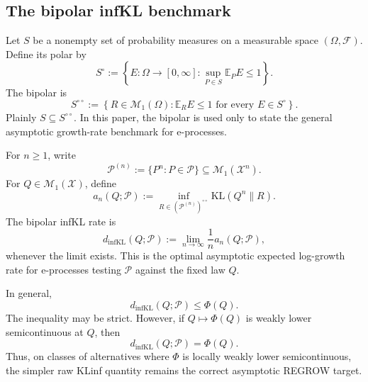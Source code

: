 \documentclass[11pt]{article}
\newcommand{\KL}{\mathrm{KL}}
\theoremstyle{definition}
\theoremstyle{definition}
\begin{document}
\subsection{The bipolar infKL benchmark}

Let \(S\) be a nonempty set of probability measures on a measurable space \((\Omega,\mathcal F)\).
Define its polar by
\[
  S^\circ
  :=
  \left\{
    E:\Omega\to[0,\infty]:
    \sup_{P\in S}\mathbb E_P E\le 1
  \right\}.
\]
The bipolar is
\[
  S^{\circ\circ}
  :=
  \left\{
    R\in\mathcal M_1(\Omega):
    \mathbb E_R E\le 1
    \text{ for every }E\in S^\circ
  \right\}.
\]
Plainly \(S\subseteq S^{\circ\circ}\). In this paper, the bipolar is used only to state the
general asymptotic growth-rate benchmark for e-processes.

For \(n\ge1\), write
\[
  \mathcal P^{(n)}
  :=
  \{P^n:P\in\mathcal P\}
  \subseteq\mathcal M_1(\mathcal X^n).
\]
For \(Q\in\mathcal M_1(\mathcal X)\), define
\[
  a_n(Q;\mathcal P)
  :=
  \inf_{R\in(\mathcal P^{(n)})^{\circ\circ}}
  \KL(Q^n\|R).
\]
The bipolar infKL rate is
\[
  d_{\mathrm{infKL}}(Q;\mathcal P)
  :=
  \lim_{n\to\infty}\frac1n a_n(Q;\mathcal P),
\]
whenever the limit exists. This is the optimal
asymptotic expected log-growth rate for e-processes testing \(\mathcal P\) against the fixed law
\(Q\).

In general,
\[
  d_{\mathrm{infKL}}(Q;\mathcal P)
  \le
  \Phi(Q).
\]
The inequality may be strict. However, if \(Q\mapsto\Phi(Q)\) is weakly lower semicontinuous at
\(Q\), then
\[
  d_{\mathrm{infKL}}(Q;\mathcal P)=\Phi(Q).
\]
Thus, on classes of alternatives where \(\Phi\) is locally weakly lower semicontinuous, the simpler
raw KLinf quantity remains the correct asymptotic REGROW target.
\end{document}
